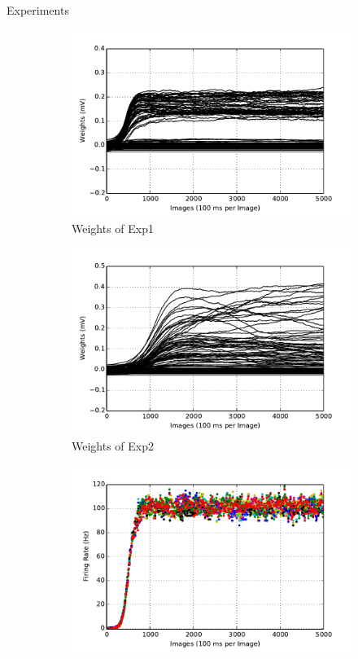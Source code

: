 	Experiments
	\begin{figure}
		\centering
		\begin{subfigure}[t]{0.4\textwidth}
			\includegraphics[width=\textwidth]{pics_ae/exp1_weights_s.pdf}
			\caption{Weights of Exp1}
		\end{subfigure}
		\begin{subfigure}[t]{0.4\textwidth}
			\includegraphics[width=\textwidth]{pics_ae/exp2_weights_s.pdf}
			\caption{Weights of Exp2}
		\end{subfigure}
		\begin{subfigure}[t]{0.4\textwidth}
			\includegraphics[width=\textwidth]{pics_ae/exp1_recon_s.pdf}

\end{subfigure}
\end{figure}
